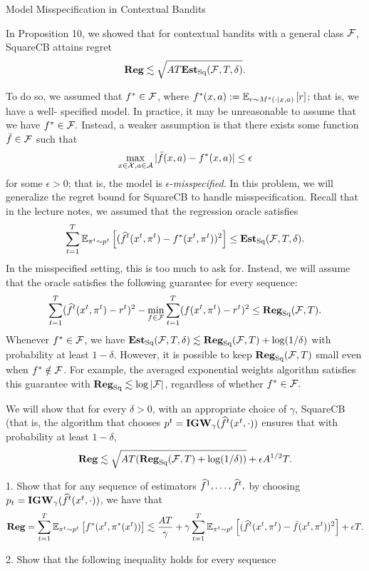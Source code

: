 \begin{exercise}[]{Model Misspecification in Contextual Bandits}
\end{exercise}
In Proposition 10, we showed that for contextual bandits with a general class $\F$,
 SquareCB attains regret
 \[ \Reg \lesssim \sqrt{AT \EstSq(\F,T,\delta)}.\]

 To do so, we assumed that $f^* \in \F$, where 
 $f^*(x,a) := \EEs{r}{r\sim M^*(\cdot|x,a)}$; that is, we have a well- specified model. 
 In practice, it may be unreasonable to assume that we have $f^* \in \F.$
 Instead, a weaker assumption is that there exists some function $\bar f \in \F$ such that
 \[ \max_{x \in \X, a \in \A} |\bar f(x,a)-f^*(x,a)|\leq \epsilon\]
 for some $\epsilon >0$; that is, the model is $\epsilon$-\textit{misspecified}. In this problem,
 we will generalize the regret bound for SquareCB to handle misspecification. Recall that in the lecture notes, we assumed
 that the regression oracle satisfies
 \[ \sum_{t=1}^T \EEs{(\wh f^t(x^t,\pi^t)-f^*(x^t,\pi^t))^2}{\pi^t \sim p^t}\leq \EstSq(\F,T,\delta).\]
 In the misspecified setting, this is too much to ask for. 
 Instead, we will assume that the oracle satisfies the following guarantee for every sequence:
\[ \sum_{t=1}^T(\wh f^t(x^t,\pi^t)-r^t)^2 -\min_{f\in \F}\sum_{t=1}^T(f(x^t,\pi^t)-r^t)^2\leq \Reg_{\text{Sq}}(\F,T).\]
Whenever $f^* \in \F$, we have $\EstSq(\F,T,\delta)\lesssim \Reg_{\text{Sq}}(\F,T)+ \log(1/\delta)$ with probability at least $1-\delta$.
However, it is possible to keep $\Reg_{\text{Sq}}(\F,T)$ small even when $f^* \notin \F$.
For example, the averaged exponential weights algorithm satisfies this guarantee with 
$\Reg_{\text{Sq}} \lesssim \log |\F|$, regardless of whether $f^* \in \F.$

We will show that for every $\delta > 0$, with an appropriate choice of $\gamma$, SquareCB (that is, the algorithm that chooses $p^t =\textbf{IGW}_\gamma(\wh f^t(x^t,\cdot))$ 
ensures that with probability at least $1-\delta$,
\[ \Reg \lesssim \sqrt{AT (\Reg_{\text{Sq}}(\F,T)+\log(1/\delta))} +\epsilon A^{1/2}T.\]

1.  Show that for any sequence of estimators 
$\wh f^1 ,\ldots,\wh f^t,$ by choosing $p_t = \textbf{IGW}_\gamma(\wh f^t(x^t , \cdot))$, we have that
\[\Reg= \sum_{t=1}^T \EEs{f^*(x^t,\pi^*(x^t))}{\pi^t\sim p^t} \lesssim \frac{AT}{\gamma}+ \gamma \sum_{t=1}^T
\EEs{(\wh f^t(x^t,\pi^t)-\bar f(x^t,\pi^t))^2}{\pi^t \sim p^t}+\epsilon T.\]

2. Show that the following inequality holds for every sequence


\begin{solution}[TODO]
\end{solution}
